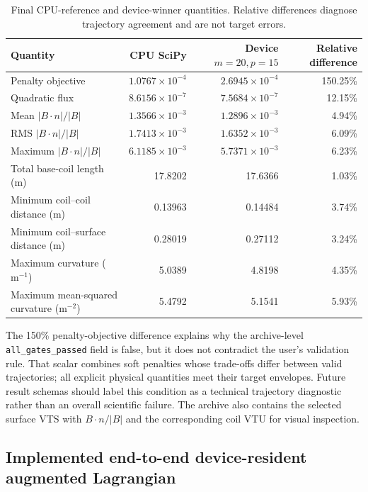 \documentclass[11pt,a4paper]{article}
\newcommand{\code}[1]{\texttt{#1}}
\begin{document}
\begin{table}[htbp]
\centering
\small
\caption{Final CPU-reference and device-winner quantities.  Relative
differences diagnose trajectory agreement and are not target errors.}
\label{tab:device-replay-qoi}
\begin{tabular}{lrrr}
\toprule
Quantity & CPU SciPy & Device $m=20,p=15$ & Relative difference \\
\midrule
Penalty objective & $1.0767\times10^{-4}$ & $2.6945\times10^{-4}$ & 150.25\% \\
Quadratic flux & $8.6156\times10^{-7}$ & $7.5684\times10^{-7}$ & 12.15\% \\
Mean $|B\cdot n|/|B|$ & $1.3566\times10^{-3}$ & $1.2896\times10^{-3}$ & 4.94\% \\
RMS $|B\cdot n|/|B|$ & $1.7413\times10^{-3}$ & $1.6352\times10^{-3}$ & 6.09\% \\
Maximum $|B\cdot n|/|B|$ & $6.1185\times10^{-3}$ & $5.7371\times10^{-3}$ & 6.23\% \\
Total base-coil length (m) & 17.8202 & 17.6366 & 1.03\% \\
Minimum coil--coil distance (m) & 0.13963 & 0.14484 & 3.74\% \\
Minimum coil--surface distance (m) & 0.28019 & 0.27112 & 3.24\% \\
Maximum curvature ($\mathrm{m}^{-1}$) & 5.0389 & 4.8198 & 4.35\% \\
Maximum mean-squared curvature ($\mathrm{m}^{-2}$) & 5.4792 & 5.1541 & 5.93\% \\
\bottomrule
\end{tabular}
\end{table}

The 150\% penalty-objective difference explains why the archive-level
\code{all\_gates\_passed} field is false, but it does not contradict the user's
validation rule.  That scalar combines soft penalties whose trade-offs differ
between valid trajectories; all explicit physical quantities meet their target
envelopes.  Future result schemas should label this condition as a technical
trajectory diagnostic rather than an overall scientific failure.  The archive
also contains the selected surface VTS with $B\cdot n/|B|$ and the corresponding
coil VTU for visual inspection.

\subsection{Implemented end-to-end device-resident augmented Lagrangian}
\end{document}
